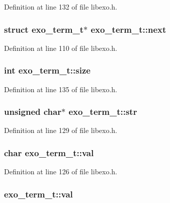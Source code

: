 Definition at line 132 of file libexo.h.
\subsubsection[{next}]{\setlength{\rightskip}{0pt plus 5cm}struct {\bf exo\_\-term\_\-t}$\ast$ {\bf exo\_\-term\_\-t::next}\hspace{0.3cm}{\tt  [read]}}\label{structexo__term__t_fb192f34c36ddf7a5793ab7457294543}




Definition at line 110 of file libexo.h.
\subsubsection[{size}]{\setlength{\rightskip}{0pt plus 5cm}int {\bf exo\_\-term\_\-t::size}}\label{structexo__term__t_81df90d4deda607d7ec5b35202a69215}




Definition at line 135 of file libexo.h.
\subsubsection[{str}]{\setlength{\rightskip}{0pt plus 5cm}unsigned char$\ast$ {\bf exo\_\-term\_\-t::str}}\label{structexo__term__t_7e8b9352a2ae7dbff6e63f6759a77428}




Definition at line 129 of file libexo.h.
\subsubsection[{val}]{\setlength{\rightskip}{0pt plus 5cm}char {\bf exo\_\-term\_\-t::val}}\label{structexo__term__t_d55158c99e232b68c6a363c9f3a7ecf2}




Definition at line 126 of file libexo.h.
\subsubsection[{val}]{ {\bf exo\_\-term\_\-t::val}}\label{structexo__term__t_78bf0fe61b0bcdcd6e82e5b0c7c8adaf}




